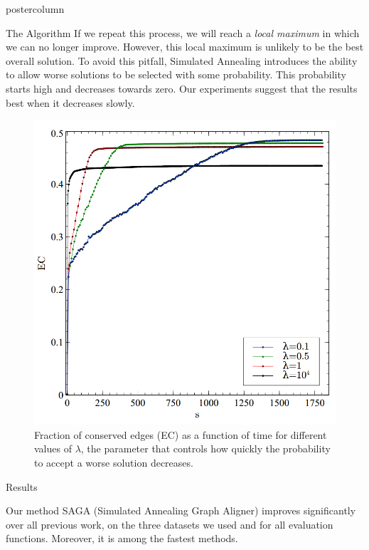 \documentclass[final,hyperref={pdfpagelabels=false}]{beamer}
\begin{document}
\begin{frame}
\begin{columns}
\begin{column}{.49\textwidth}
\begin{beamercolorbox}[center,wd=\textwidth]{postercolumn}
\begin{minipage}[T]{.95\textwidth}
{\begin{block}{The Algorithm}
If we repeat this process, we will
reach a \textit{local maximum} in which we can no longer improve. However, this local maximum is unlikely to be the best overall solution. To avoid this pitfall, Simulated Annealing introduces the ability to allow worse solutions to be selected with some probability. This probability starts high and decreases towards zero. Our experiments suggest that the results best when it decreases slowly.
\begin{figure}
\centering
\includegraphics[width=0.57\linewidth]{../figures/tempschedule}
\caption{Fraction of conserved edges (EC) as a function of time for different values of $\lambda$, the parameter that controls how quickly the probability to accept a worse solution decreases.}
\label{fig:tempschedule}
\end{figure}             
            
            \end{block}
            \vspace{20px}
            \begin{block}{Results}

Our method SAGA (Simulated Annealing Graph Aligner) improves significantly over all previous work, on the three datasets we used and for all evaluation functions. Moreover, it is among the fastest methods.
              

\end{block}}
\end{minipage}
\end{beamercolorbox}
\end{column}
\end{columns}
\end{frame}
\end{document}
